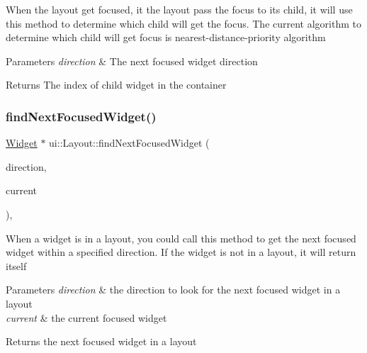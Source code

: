 When the layout get focused, it the layout pass the focus to its child, it will use this method to determine which child will get the focus. The current algorithm to determine which child will get focus is nearest-\/distance-\/priority algorithm 
\begin{DoxyParams}{Parameters}
{\em direction} & The next focused widget direction \\
\hline
\end{DoxyParams}
\begin{DoxyReturn}{Returns}
The index of child widget in the container 
\end{DoxyReturn}
\mbox{\label{classui_1_1Layout_a49f3db931bff292e279ddd65dcd3fe6f}} 
\subsubsection{\texorpdfstring{find\+Next\+Focused\+Widget()}{findNextFocusedWidget()}\hspace{0.1cm}{\footnotesize\ttfamily [1/2]}}
{\footnotesize\ttfamily \hyperlink{classui_1_1Widget}{Widget} $\ast$ ui\+::\+Layout\+::find\+Next\+Focused\+Widget (\begin{DoxyParamCaption}\item[{\hyperlink{classui_1_1Widget_a8ae8e8fc793a04a87584205cd1e8a8a5}{Focus\+Direction}}]{direction,  }\item[{\hyperlink{classui_1_1Widget}{Widget} $\ast$}]{current }\end{DoxyParamCaption})\hspace{0.3cm}{\ttfamily [override]}, {\ttfamily [virtual]}}

When a widget is in a layout, you could call this method to get the next focused widget within a specified direction. If the widget is not in a layout, it will return itself 
\begin{DoxyParams}{Parameters}
{\em direction} & the direction to look for the next focused widget in a layout \\
\hline
{\em current} & the current focused widget \\
\hline
\end{DoxyParams}
\begin{DoxyReturn}{Returns}
the next focused widget in a layout 
\end{DoxyReturn}


